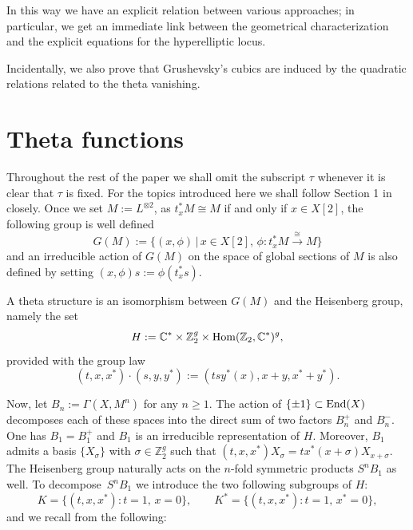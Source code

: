\documentclass[pdftex]{sigma}
\numberwithin{equation}{section}
\newcommand{\CC}{{\mathbb{C}}}
\newcommand{\ZZ}{{\mathbb{Z}}}
\def\ZZ{{\mathbb Z}}
\def\s{\sigma}
\begin{document}
In this way we have an explicit relation between various approaches; in particular, we get an immediate link between the geometrical characterization and the explicit equations for the hyperelliptic locus.

Incidentally, we also prove that Grushevsky's cubics are induced by the quadratic relations related to the theta vanishing.

\section{Theta functions}

Throughout the rest of the paper we shall omit the subscript $\tau$ whenever it is clear that $\tau$ is fixed.
For the topics introduced here we shall follow Section 1 in \cite{vG} closely. Once we set $ M:= L^{\otimes 2}$, as $t_{x}^*M\cong M$ if and only if $x \in X[2]$, the following group is well defined
\[
G(M):=\big\{(x, \phi) \,|\, x\in X[2], \, \phi\colon t_{x}^*M \xrightarrow{\cong} M \big\}
\]
and an irreducible action of $G(M)$ on the space of global sections of $M$ is also defined by setting $(x, \phi) s := \phi (t_{x}^*s)$.

A theta structure is an isomorphism between $G(M)$
and the Heisenberg group, namely the set
\[
H:=\CC^{*}\times\ZZ_{2}^g\times {\rm Hom}(\ZZ_{2}, \CC^{*})^g,
\]
provided with the group law
\[
(t,x,x^*) \cdot (s,y,y^*) :=(tsy^*(x), x+y, x^*+y^*).
\]

Now, let $B_n:=\Gamma(X, M^n)$ for any $n \geq 1$.
The action of $\{ \pm 1 \}\subset {\rm End}( X)$ decomposes each of these spaces into the direct sum of two factors $B_n ^{+}$ and $ B_n ^-$. One has $B_1= B_1^+$ and $B_1$ is an irreducible representation of $H$.
Moreover, $B_1$ admits a basis $\{X_{\s}\}$ with $\s\in\ZZ_2^g$ such that
$(t, x, x^*)X_{\s}=tx^*(x+\s)X_{x+\s}$. The Heisenberg group naturally acts on the $n$-fold symmetric products $S^nB_1$ as well. To decompose~$S^nB_1$ we introduce the two following subgroups of $H$:
\[
K=\{(t, x, x^*)\colon t=1,\, x=0\} , \qquad K^*=\{(t, x, x^*)\colon t=1,\, x^*=0\},
\]
and we recall from \cite{vG} the following:
\end{document}
